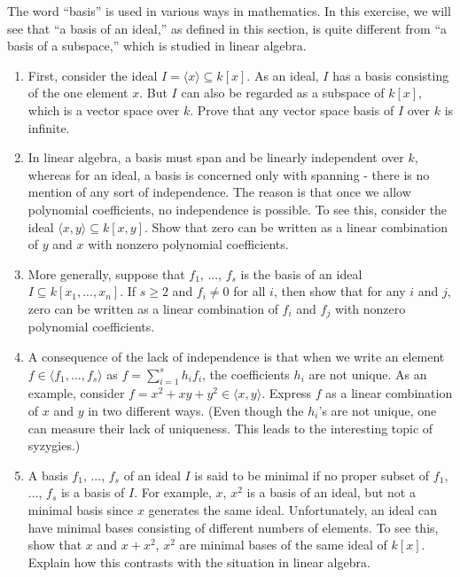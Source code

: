 \begin{exercise}{6}
The word ``basis'' is used in various ways in mathematics. In this exercise, we will see that ``a basis of an ideal,'' as defined in this section, is quite different from ``a basis of a subspace,'' which is studied in linear algebra.
\begin{enumerate}
    \item First, consider the ideal $I = \langle x\rangle\subseteq k[x]$. As an ideal, $I$ has a basis consisting of the one element $x$. But $I$ can also be regarded as a subspace of $k[x]$, which is a vector space over $k$. Prove that any vector space basis of $I$ over $k$ is infinite.
    \item In linear algebra, a basis must span and be linearly independent over $k$, whereas for an ideal, a basis is concerned only with spanning - there is no mention of any sort of independence. The reason is that once we allow polynomial coefficients, no independence is possible. To see this, consider the ideal $\langle x,y\rangle \subseteq k[x,y]$. Show that zero can be written as a linear combination of $y$ and $x$ with nonzero polynomial coefficients.
    \item More generally, suppose that $f_1$, ..., $f_s$ is the basis of an ideal $I\subseteq k[x_1,...,x_n]$. If $s\geq 2$ and $f_i\neq 0$ for all $i$, then show that for any $i$ and $j$, zero can be written as a linear combination of $f_i$ and $f_j$ with nonzero polynomial coefficients.
    \item A consequence of the lack of independence is that when we write an element $f\in \langle f_1,...,f_s\rangle$ as $f = \sum_{i=1}^s h_i f_i$, the coefficients $h_i$ are not unique. As an example, consider $f = x^2 + xy + y^2\in \langle x,y\rangle$. Express $f$ as a linear combination of $x$ and $y$ in two different ways. (Even though the $h_i$'s are not unique, one can measure their lack of uniqueness. This leads to the interesting topic of syzygies.)
    \item A basis $f_1$, ..., $f_s$ of an ideal $I$ is said to be minimal if no proper subset of $f_1$, ..., $f_s$ is a basis of $I$. For example, $x$, $x^2$ is a basis of an ideal, but not a minimal basis since $x$ generates the same ideal. Unfortunately, an ideal can have minimal bases consisting of different numbers of elements. To see this, show that $x$ and $x+x^2$, $x^2$ are minimal bases of the same ideal of $k[x]$. Explain how this contrasts with the situation in linear algebra.
\end{enumerate}
\end{exercise}
